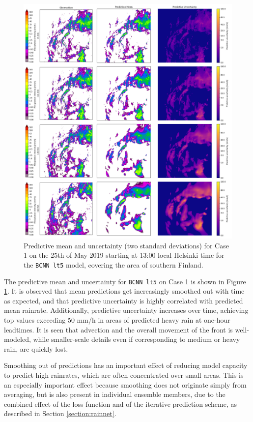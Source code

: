 \begin{figure}[H]
	\centering
	\includegraphics[width=\textwidth]{images/cases/bcnn_mean_case1}
	\caption{Predictive mean and uncertainty (two standard deviations) for Case 1 on the 25th of May 2019 starting at 13:00 local Helsinki time for the \texttt{BCNN lt5} model, covering the area of southern Finland.}
	\label{fig:bcnn_mean_case1}
\end{figure}

The predictive mean and uncertainty for \texttt{BCNN lt5} on Case 1 is shown in Figure \ref{fig:bcnn_mean_case1}. It is observed that mean predictions get increasingly smoothed out with time as expected, and that predictive uncertainty is highly correlated with predicted mean rainrate. 
%
%
Additionally, predictive uncertainty increases over time, achieving top values exceeding 50 mm/h in areas of predicted heavy rain at one-hour leadtimes. It is seen that advection and the overall movement of the front is well-modeled, while smaller-scale details even if corresponding to medium or heavy rain, are quickly lost. 



Smoothing out of predictions has an important effect of reducing model capacity to predict high rainrates, which are often concentrated over small areas. This is an especially important effect because smoothing does not originate simply from averaging, but is also present in individual ensemble members, due to the combined effect of the loss function and of the iterative prediction scheme, as described in Section \ref{section:rainnet}. 

